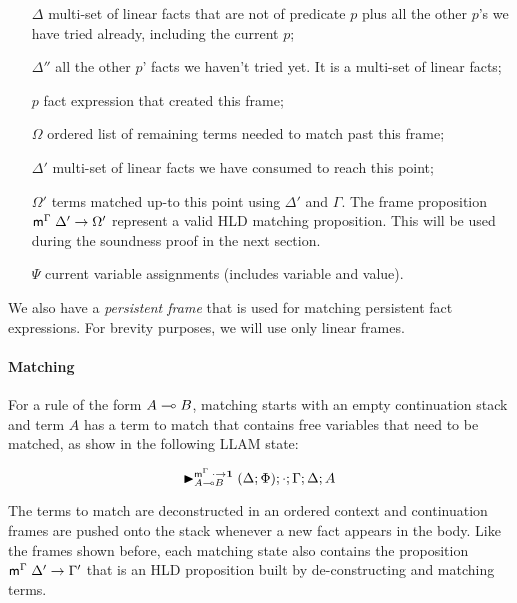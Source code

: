 \begin{enumerate}

  \item[$\Delta$] multi-set of linear facts that are not of predicate $p$ plus
all the other $p$'s we have tried already, including the current $p$;

  \item[$\Delta''$] all the other $p$' facts we haven't tried yet. It is a multi-set
  of linear facts;

  \item[$p$] fact expression that created this frame;

  \item[$\Omega$] ordered list of remaining terms needed to match past this
  frame;

  \item[$\Delta'$] multi-set of linear facts we have consumed to reach this point;

  \item[$\Omega'$] terms matched up-to this point using $\Delta'$ and $\Gamma$. 
The frame proposition $\mathsf{m}^{\Gamma} \; \Delta' \rightarrow \Omega'$ represent a valid HLD
matching proposition. This will be used during the soundness proof in the next
section.

   \item[$\Psi$] current variable assignments (includes variable and value).
     
\end{enumerate}

We also have a \emph{persistent frame} that is used for matching persistent fact
expressions. For brevity purposes, we will use only linear frames.

\paragraph{Matching} For a rule of the form $A \multimap B$, matching starts with
an empty continuation stack and term $A$ has a term to match that contains free
variables that need to be matched, as show in the following LLAM state:

\[
   {\blacktriangleright}_{A \multimap B}^{\mathsf{m}^\Gamma \; \cdot
   \rightarrow \mathbf{1}} \; (\Delta; \Phi); \cdot; \Gamma; \Delta; A
\]

The terms to match are deconstructed in an ordered context and continuation
frames are pushed onto the stack whenever a new fact appears in the body. Like
the frames shown before, each matching state also contains the proposition
$\mathsf{m}^{\Gamma} \; \Delta' \rightarrow \Gamma'$ that is an HLD proposition built by
de-constructing and matching terms.

